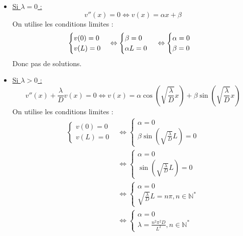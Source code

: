 \documentclass[12pt,a4paper]{article}
\begin{document}
\begin{enumerate}
\begin{itemize}
        \item \underline{Si $\lambda = 0$ :}
        $$
        v''(x) = 0
        \Leftrightarrow
        v(x) = \alpha x + \beta
        $$
        On utilise les conditions limites :
        $$
        \begin{cases}
            v(0) = 0\\
            v(L) = 0
        \end{cases}
        \Leftrightarrow
        \begin{cases}
            \beta = 0\\
            \alpha L = 0
        \end{cases}\\
        \Leftrightarrow
        \begin{cases}
            \alpha = 0\\
            \beta = 0
        \end{cases}
        $$
        Donc pas de solutions.

        \item \underline{Si $\lambda > 0$ :}
        $$
        v''(x) + \frac{\lambda}{D} v(x) = 0
        \Leftrightarrow
        v(x) = \alpha \cos\left(\sqrt{\frac{\lambda}{D}} x\right) + \beta \sin\left(\sqrt{\frac{\lambda}{D}} x\right)
        $$
        On utilise les conditions limites :
        \begin{align*}
            \begin{cases}
                v(0) = 0\\
                v(L) = 0
            \end{cases}
            &\Leftrightarrow
            \begin{cases}
                \alpha = 0\\
                \beta \sin\left(\sqrt{\frac{\lambda}{D}} L\right) = 0
            \end{cases}\\
            &\Leftrightarrow
            \begin{cases}
                \alpha = 0\\
                \sin\left(\sqrt{\frac{\lambda}{D}} L\right) = 0
            \end{cases}\\
            &\Leftrightarrow
            \begin{cases}
                \alpha = 0\\
                \sqrt{\frac{\lambda}{D}} L = n\pi, n \in \mathbb{N}^*
            \end{cases}\\
            &\Leftrightarrow
            \begin{cases}
                \alpha = 0\\
                \lambda = \frac{n^2 \pi^2 D}{L^2}, n \in \mathbb{N}^*
            \end{cases}
        \end{align*}\\


\end{itemize}
\end{enumerate}
\end{document}
